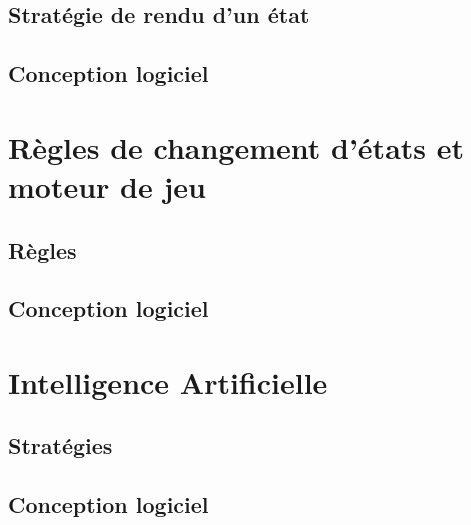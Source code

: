\documentclass[a4paper,12pt]{article}
\begin{document}
\subsection{Stratégie de rendu d'un état}


\subsection{Conception logiciel}


\clearpage
\section{Règles de changement d'états et moteur de jeu}

\subsection{Règles}

\clearpage
\subsection{Conception logiciel}




\section{Intelligence Artificielle}

\subsection{Stratégies}

\clearpage
\subsection{Conception logiciel}
\end{document}
